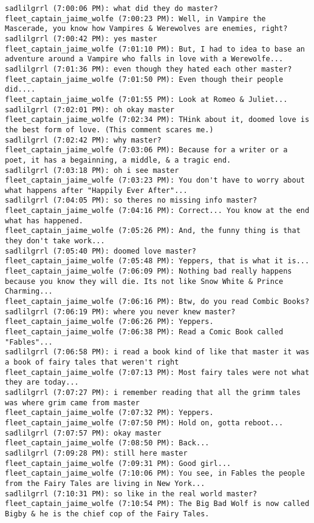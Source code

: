 \begin{verbatim}
sadlilgrrl (7:00:06 PM): what did they do master?
fleet_captain_jaime_wolfe (7:00:23 PM): Well, in Vampire the Mascerade, you know how Vampires & Werewolves are enemies, right?
sadlilgrrl (7:00:42 PM): yes master
fleet_captain_jaime_wolfe (7:01:10 PM): But, I had to idea to base an adventure around a Vampire who falls in love with a Werewolfe...
sadlilgrrl (7:01:36 PM): even though they hated each other master?
fleet_captain_jaime_wolfe (7:01:50 PM): Even though their people did....
fleet_captain_jaime_wolfe (7:01:55 PM): Look at Romeo & Juliet...
sadlilgrrl (7:02:01 PM): oh okay master
fleet_captain_jaime_wolfe (7:02:34 PM): THink about it, doomed love is the best form of love. (This comment scares me.)
sadlilgrrl (7:02:42 PM): why master?
fleet_captain_jaime_wolfe (7:03:06 PM): Because for a writer or a poet, it has a begainning, a middle, & a tragic end.
sadlilgrrl (7:03:18 PM): oh i see master
fleet_captain_jaime_wolfe (7:03:23 PM): You don't have to worry about what happens after "Happily Ever After"...
sadlilgrrl (7:04:05 PM): so theres no missing info master?
fleet_captain_jaime_wolfe (7:04:16 PM): Correct... You know at the end what has happened.
fleet_captain_jaime_wolfe (7:05:26 PM): And, the funny thing is that they don't take work...
sadlilgrrl (7:05:40 PM): doomed love master?
fleet_captain_jaime_wolfe (7:05:48 PM): Yeppers, that is what it is...
fleet_captain_jaime_wolfe (7:06:09 PM): Nothing bad really happens because you know they will die. Its not like Snow White & Prince Charming...
fleet_captain_jaime_wolfe (7:06:16 PM): Btw, do you read Combic Books?
sadlilgrrl (7:06:19 PM): where you never knew master?
fleet_captain_jaime_wolfe (7:06:26 PM): Yeppers.
fleet_captain_jaime_wolfe (7:06:38 PM): Read a Comic Book called "Fables"...
sadlilgrrl (7:06:58 PM): i read a book kind of like that master it was a book of fairy tales that weren't right
fleet_captain_jaime_wolfe (7:07:13 PM): Most fairy tales were not what they are today...
sadlilgrrl (7:07:27 PM): i remember reading that all the grimm tales was where grim came from master
fleet_captain_jaime_wolfe (7:07:32 PM): Yeppers.
fleet_captain_jaime_wolfe (7:07:50 PM): Hold on, gotta reboot...
sadlilgrrl (7:07:57 PM): okay master
fleet_captain_jaime_wolfe (7:08:50 PM): Back...
sadlilgrrl (7:09:28 PM): still here master
fleet_captain_jaime_wolfe (7:09:31 PM): Good girl...
fleet_captain_jaime_wolfe (7:10:06 PM): You see, in Fables the people from the Fairy Tales are living in New York...
sadlilgrrl (7:10:31 PM): so like in the real world master?
fleet_captain_jaime_wolfe (7:10:54 PM): The Big Bad Wolf is now called Bigby & he is the chief cop of the Fairy Tales.

\end{verbatim}
